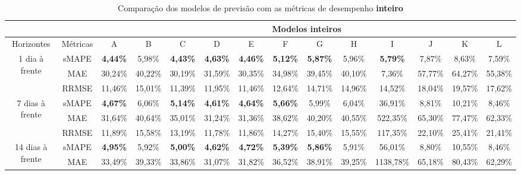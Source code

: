 \begin{landscape}
\begin{table}[!htpb]
	\centering
	\caption{Comparação dos modelos de previsão com as métricas de desempenho \textbf{inteiro}}\label{tb:apd-int}
\begin{tabular}{@{}cccccccccccccc@{}}
	\toprule
	&          & \multicolumn{12}{c}{Modelos inteiros}                                                                                                                                         \\ \midrule
	Horizontes                        & Métricas & A               & B       & C               & D               & E               & F               & G               & H       & I               & J       & K       & L       \\ \midrule
	\multirow{3}{*}{1 dia à frente}   & sMAPE    & \textbf{4,44\%} & 5,98\%  & \textbf{4,43\%} & \textbf{4,63\%} & \textbf{4,46\%} & \textbf{5,12\%} & \textbf{5,87\%} & 5,96\%  & \textbf{5,79\%} & 7,87\%  & 8,63\%  & 7,59\%  \\
	& MAE      & 30,24\%         & 40,22\% & 30,19\%         & 31,59\%         & 30,35\%         & 34,98\%         & 39,45\%         & 40,10\% & 7,36\%          & 57,77\% & 64,27\% & 55,38\% \\
	& RRMSE    & 11,46\%         & 15,01\% & 11,39\%         & 11,95\%         & 11,46\%         & 12,64\%         & 14,71\%         & 14,96\% & 14,52\%         & 18,04\% & 19,57\% & 17,62\% \\ \midrule
	\multirow{3}{*}{7 dias à frente}  & sMAPE    & \textbf{4,67\%} & 6,06\%  & \textbf{5,14\%} & \textbf{4,61\%} & \textbf{4,64\%} & \textbf{5,66\%} & 5,99\%          & 6,04\%  & 36,91\%         & 8,81\%  & 10,21\% & 8,46\%  \\
	& MAE      & 31,64\%         & 40,64\% & 35,01\%         & 31,24\%         & 31,36\%         & 38,62\%         & 40,20\%         & 40,55\% & 522,35\%        & 65,30\% & 77,47\% & 62,33\% \\
	& RRMSE    & 11,89\%         & 15,58\% & 13,19\%         & 11,78\%         & 11,86\%         & 14,27\%         & 15,40\%         & 15,55\% & 117,35\%        & 22,10\% & 25,41\% & 21,41\% \\ \midrule
	\multirow{3}{*}{14 dias à frente} & sMAPE    & \textbf{4,95\%} & 5,92\%  & \textbf{5,00\%} & \textbf{4,62\%} & \textbf{4,72\%} & \textbf{5,39\%} & \textbf{5,86\%} & 5,91\%  & 56,01\%         & 8,80\%  & 10,55\% & 8,46\%  \\
	& MAE      & 33,49\%         & 39,33\% & 33,86\%         & 31,07\%         & 31,82\%         & 36,52\%         & 38,91\%         & 39,25\% & 1138,78\%       & 65,18\% & 80,43\% & 62,29\% \\

\end{tabular}
\end{table}
\end{landscape}
